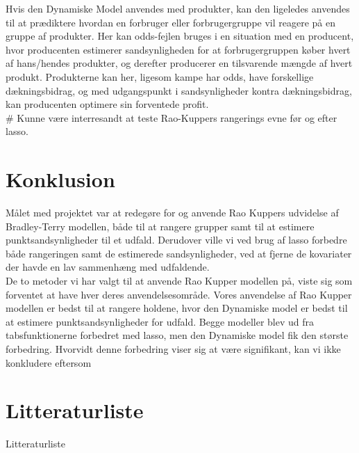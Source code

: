 \documentclass[11pt,a4paper]{article}
\begin{document}
Hvis den Dynamiske Model anvendes med produkter, kan den ligeledes anvendes til at prædiktere hvordan en forbruger eller forbrugergruppe vil reagere på en gruppe af produkter. Her kan odds-fejlen bruges i en situation med en producent, hvor producenten estimerer sandsynligheden for at forbrugergruppen køber hvert af hans/hendes produkter, og derefter producerer en tilsvarende mængde af hvert produkt. Produkterne kan her, ligesom kampe har odds, have forskellige dækningsbidrag, og med udgangspunkt i sandsynligheder kontra dækningsbidrag, kan producenten optimere sin forventede profit. \\
\# Kunne være interresandt at teste Rao-Kuppers rangerings evne før og efter lasso.
\section{Konklusion}

Målet med projektet var at redegøre for og anvende Rao Kuppers udvidelse af Bradley-Terry modellen, både til at rangere grupper samt til at estimere punktsandsynligheder til et udfald. Derudover ville vi ved brug af lasso forbedre både rangeringen samt de estimerede sandsynligheder, ved at fjerne de kovariater der havde en lav sammenhæng med udfaldende. \\
\newline
De to metoder vi har valgt til at anvende Rao Kupper modellen på, viste sig som forventet at have hver deres anvendelsesområde. Vores anvendelse af Rao Kupper modellen er bedst til at rangere holdene, hvor den Dynamiske model er bedst til at estimere punktsandsynligheder for udfald. Begge modeller blev ud fra tabsfunktionerne forbedret med lasso, men den Dynamiske model fik den største forbedring. Hvorvidt denne forbedring viser sig at være signifikant, kan vi ikke konkludere eftersom 
\clearpage
\section{Litteraturliste}
Litteraturliste
\clearpage
\end{document}
